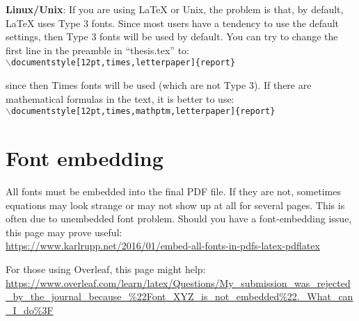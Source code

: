 {\bf Linux/Unix}: If you are using LaTeX or Unix, the problem is that, by default, LaTeX uses Type 3 fonts. Since most users have a tendency to use the default settings, then Type 3 fonts will be used by default. You can try to change the first line in the preamble in ``thesis.tex'' to:\\
%
{\tt $\backslash$documentstyle[12pt,times,letterpaper]\{report\}}

\noindent
since then Times fonts will be used (which are not Type 3). If there are mathematical formulas in the text, it is better to use:\\
%
{\tt $\backslash$documentstyle[12pt,times,mathptm,letterpaper]\{report\}}


\section{Font embedding}

All fonts must be embedded into the final PDF file. If they are not, sometimes equations may look strange or may not show up at all for several pages. This is often due to unembedded font problem. Should you have a font-embedding issue, this page may prove useful:\\
%
\url{https://www.karlrupp.net/2016/01/embed-all-fonts-in-pdfs-latex-pdflatex}

For those using Overleaf, this page might help:
\url{https://www.overleaf.com/learn/latex/Questions/My_submission_was_rejected_by_the_journal_because_%22Font_XYZ_is_not_embedded%22._What_can_I_do%3F}
